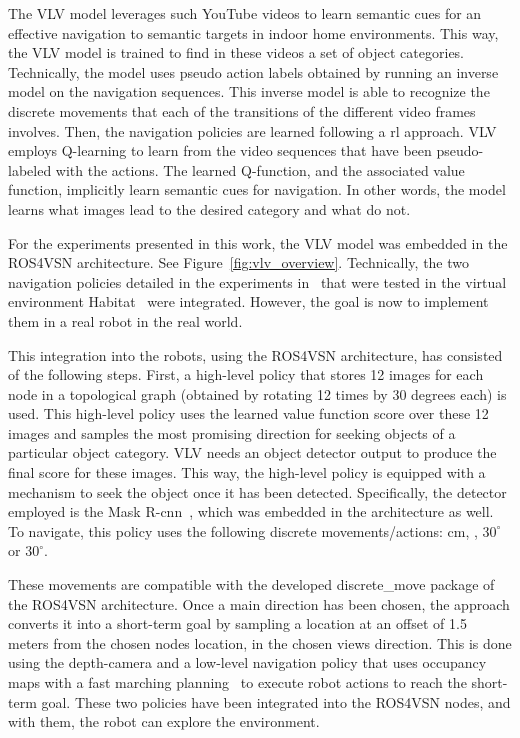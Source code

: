 The VLV model leverages such YouTube videos to learn semantic cues for an effective navigation to semantic targets in indoor home environments.
This way, the VLV model is trained to find in these videos a set of object categories.
Technically, the model uses pseudo action labels obtained by running an inverse model on the navigation sequences.
This inverse model is able to recognize the discrete movements that each of the transitions of the different video frames involves.
Then, the navigation policies are learned following a \acrshort{rl} approach.
VLV employs Q-learning to learn from the video sequences that have been pseudo-labeled with the actions.
The learned Q-function, and the associated value function, implicitly learn semantic cues for navigation.
In other words, the model learns what images lead to the desired category and what do not.

For the experiments presented in this work, the VLV model was embedded in the ROS4VSN architecture.
See Figure~\ref{fig:vlv_overview}.
Technically, the two navigation policies detailed in the experiments in~\cite{chang2020} that were tested in the virtual environment Habitat~\cite{NEURIPS2021_021bbc7e} were integrated.
However, the goal is now to implement them in a real robot in the real world.

This integration into the robots, using the ROS4VSN architecture, has consisted of the following steps.
First, a high-level policy that stores 12 images for each node in a topological graph (obtained by rotating 12 times by 30 degrees each) is used.
This high-level policy uses the learned value function score over these 12 images and samples the most promising direction for seeking objects of a particular object category.
VLV needs an object detector output to produce the final score for these images.
This way, the high-level policy is equipped with a mechanism to seek the object once it has been detected.
Specifically, the detector employed is the Mask R-\acrshort{cnn}~\cite{mask-rcnn}, which was embedded in the architecture as well.
To navigate, this policy uses the following discrete movements/actions:  cm, \turnright, $30^\circ$ or \turnleft $30^\circ$.

These movements are compatible with the developed discrete\_move package of the ROS4VSN architecture.
Once a main direction has been chosen, the approach converts it into a short-term goal by sampling a location at an offset of 1.5 meters from the chosen node\textquotesingle s location, in the chosen view\textquotesingle s direction.
This is done using the depth-camera and a low-level navigation policy that uses occupancy maps with a fast marching planning~\cite{Sethian1996} to execute robot actions to reach the short-term goal.
These two policies have been integrated into the ROS4VSN nodes, and with them, the robot can explore the environment.

